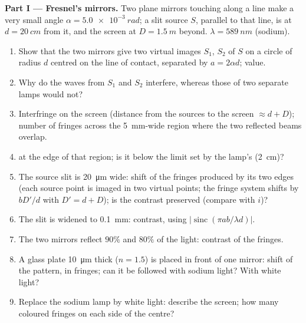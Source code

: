 \begin{problem}
\label{pb:b2:two-wave-interference:1}

\medskip
\noindent\textbf{Part I --- Fresnel's mirrors.}
Two plane mirrors touching along a line make a very small angle $\alpha =
\qty{5.0e-3}{rad}$; a slit source $S$, parallel to that line, is at $d =
\qty{20}{cm}$ from it, and the screen at $D = \qty{1.5}{m}$ beyond. $\lambda =
\qty{589}{nm}$ (sodium).
\begin{enumerate}
  \item Show that the two mirrors give two virtual images $S_1$, $S_2$ of
        $S$ on a circle of radius $d$ centred on the line of contact,
        separated by $a = 2\alpha d$; value.
  \item Why do the waves from $S_1$ and $S_2$ interfere, whereas those of
        two separate lamps would not?
  \item Interfringe on the screen (distance from the sources to the
        screen $\approx d + D$); number of fringes across the
        \qty{5}{mm}-wide region where the two reflected beams overlap.
  \item {} at the edge of that region; is it below
        the limit set by the lamp's  (\qty{2}{cm})?
  \item The source slit is \qty{20}{\micro m} wide: shift of the fringes
        produced by its two edges (each source point is imaged in two
        virtual points; the fringe system shifts by $bD'/d$ with $D' =
        d + D$); is the contrast preserved (compare with $i$)?
  \item The slit is widened to \qty{0.1}{mm}: contrast, using
        $|\operatorname{sinc}(\pi ab/\lambda d)|$.
  \item The two mirrors reflect $90\%$ and $80\%$ of the light: contrast
        of the fringes.
  \item A glass plate \qty{10}{\micro m} thick ($n = 1.5$) is placed in
        front of one mirror: shift of the pattern, in fringes; can it
        be followed with sodium light? With white light?
  \item Replace the sodium lamp by white light: describe the screen;
        how many coloured fringes on each side of the centre?
\end{enumerate}


\end{problem}

